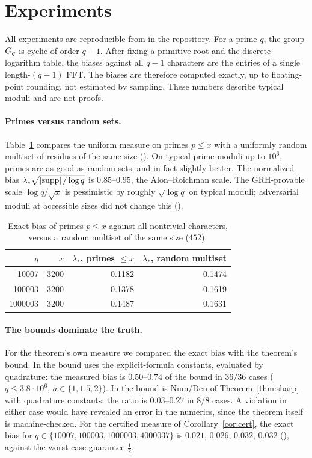 \section{Experiments}\label{sec:experiments}

All experiments are reproducible from  in the repository. For a prime $q$, the group $G_q$
is cyclic of order $q-1$. After fixing a primitive root and the discrete-logarithm table, the biases against
all $q-1$ characters are the entries of a single length-$(q-1)$ FFT. The biases are therefore computed
exactly, up to floating-point rounding, not estimated by sampling. These numbers describe typical moduli
and are not proofs.

\paragraph{Primes versus random sets.}
Table~\ref{tab:typical} compares the uniform measure on primes $p\le x$ with a uniformly random multiset of
residues of the same size (). On typical prime moduli up to $10^6$, primes are as good as
random sets, and in fact slightly better. The normalized bias $\lambda_*\sqrt{\left\lvert \mathrm{supp} \right\rvert/\log q}$ is
$0.85$--$0.95$, the Alon--Roichman scale. The GRH-provable scale $\log q/\sqrt x$ is pessimistic by roughly
$\sqrt{\log q}$ on typical moduli; adversarial moduli at accessible sizes did not change this
().

\begin{table}[ht]
\centering
\begin{tabular}{rrrr}
\toprule
$q$ & $x$ & $\lambda_*$, primes $\le x$ & $\lambda_*$, random multiset\\
\midrule
10007 & 3200 & 0.1182 & 0.1474\\
100003 & 3200 & 0.1378 & 0.1619\\
1000003 & 3200 & 0.1487 & 0.1631\\
\bottomrule
\end{tabular}
\caption{Exact bias of primes $p\le x$ against all nontrivial characters, versus a random multiset of the same
size ($452$).}\label{tab:typical}
\end{table}

\paragraph{The bounds dominate the truth.}
For the theorem's own measure we compared the exact bias with the theorem's bound. In
 the bound uses the explicit-formula constants, evaluated by quadrature: the
measured bias is $0.50$--$0.74$ of the bound in $36/36$ cases ($q\le3.8\cdot10^6$, $a\in\{1,1.5,2\}$). In
 the bound is $\mathrm{Num}/\mathrm{Den}$ of Theorem~\ref{thm:sharp} with quadrature
constants: the ratio is $0.03$--$0.27$ in $8/8$ cases. A violation in either case would have revealed an
error in the numerics, since the theorem itself is machine-checked. For the certified measure of
Corollary~\ref{cor:cert}, the exact bias for $q\in\{10007,100003,1000003,4000037\}$ is
$0.021$, $0.026$, $0.032$, $0.032$ (), against the worst-case guarantee $\frac12$.

